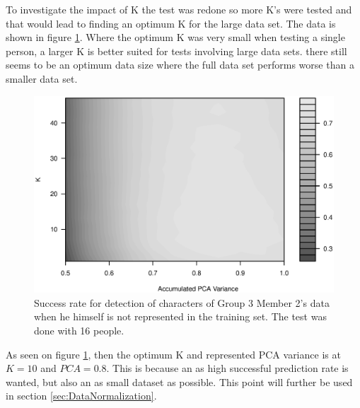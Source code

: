 To investigate the impact of K the test was redone so more K's were tested and that would lead to finding an optimum K for the large data set.
The data is shown in figure \ref{fig:k_v_PCA}. 
Where the optimum K was very small when testing a single person, a larger K is better suited for tests involving large data sets.
there still seems to be an optimum data size where the full data set performs worse than a smaller data set. 

\begin{figure}[H]
\centering
\includegraphics[width = \textwidth]{graphics/contour_k_PCA_oneVsRest}
\caption[Detailed PCA performance]{Success rate for detection of characters of Group 3 Member 2's data when he himself is not represented in the training set. 
The test was done with 16 people.}
\label{fig:k_v_PCA}
\end{figure}

As seen on figure \ref{fig:k_v_PCA}, then the optimum K and represented PCA variance is at $K = 10$ and $PCA = 0.8$. 
This is because an as high successful prediction rate is wanted, but also an as small dataset as possible. 
This point will further be used in section \ref{sec:DataNormalization}.





